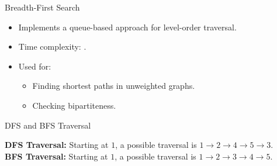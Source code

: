 \begin{properties}[]{Breadth-First Search}
    \begin{itemize}
        \item Implements a queue-based approach for level-order traversal.
        \item Time complexity: .
        \item Used for:
              \begin{itemize}
                  \item Finding shortest paths in unweighted graphs.
                  \item Checking bipartiteness.
              \end{itemize}
    \end{itemize}
\end{properties}

\begin{example}[]{DFS and BFS Traversal}
    \begin{center}
    \end{center}
    \textbf{DFS Traversal:} Starting at $1$, a possible traversal is $1 \to 2 \to 4 \to 5 \to 3$.\\
    \textbf{BFS Traversal:} Starting at $1$, a possible traversal is $1 \to 2 \to 3 \to 4 \to 5$.
\end{example}
